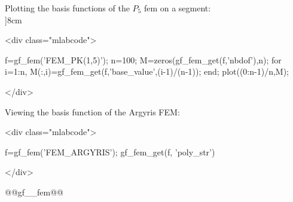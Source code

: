 \documentclass[11pt,a4paper]{article}
\newcommand{\newpage}{}
\newenvironment{minipage}[2]{}{}
\newenvironment{mcode}{\begin{rawxml}<div class="mlabcode">\end{rawxml}\begin{example}}{\end{example}\begin{rawxml}</div>\end{rawxml}}
\newenvironment{mcode}{\begin{alltt}}{\end{alltt}}
\begin{document}
\begin{cmdexamples}
  Plotting the basis functions of the $P_5$ fem on a segment:\\
  \begin{minipage}[b]{8cm}
  \begin{mcode}
f=gf_fem('FEM_PK(1,5)');
n=100; M=zeros(gf_fem_get(f,'nbdof'),n);
for i=1:n, 
  M(:,i)=gf_fem_get(f,'base_value',(i-1)/(n-1)); 
end;
plot((0:n-1)/n,M);
  \end{mcode}
  \end{minipage}  

\par
Viewing the basis function of the Argyris FEM:
\begin{mcode}
f=gf_fem('FEM_ARGYRIS');
gf_fem_get(f, 'poly_str')
\end{mcode}
\end{cmdexamples}
\begin{gfseealso}
@@gf__fem@@
\end{gfseealso}
\newpage

\end{document}
